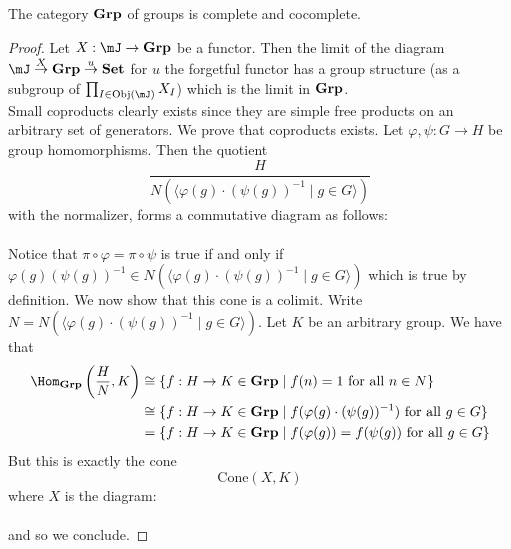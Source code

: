 \documentclass[a4paper]{article}
\begin{document}
\begin{crl}{}{} The category $\bold{Grp}$ of groups is complete and cocomplete. 
\begin{proof}
Let $X:\mJ\to\bold{Grp}$ be a functor. Then the limit of the diagram $\mJ\overset{X}{\to}\bold{Grp}\overset{u}{\to}\bold{Set}$ for $u$ the forgetful functor has a group structure (as a subgroup of $\prod_{I\in\text{Obj}(\mJ)}X_I$) which is the limit in $\bold{Grp}$. \\

Small coproducts clearly exists since they are simple free products on an arbitrary set of generators. We prove that coproducts exists. Let $\varphi,\psi:G\to H$ be group homomorphisms. Then the quotient $$\frac{H}{N(\langle\varphi(g)\cdot(\psi(g))^{-1}\;|\;g\in G\rangle)}$$ with the normalizer, forms a commutative diagram as follows: \\
 \\
Notice that $\pi\circ\varphi=\pi\circ\psi$ is true if and only if $\varphi(g)(\psi(g))^{-1}\in N(\langle\varphi(g)\cdot(\psi(g))^{-1}\;|\;g\in G\rangle)$ which is true by definition. We now show that this cone is a colimit. Write $N=N(\langle\varphi(g)\cdot(\psi(g))^{-1}\;|\;g\in G\rangle)$. Let $K$ be an arbitrary group. We have that 
\begin{align*}
\Hom_{\bold{Grp}}\left(\frac{H}{N},K\right)&\cong\{f:H\to K\in\bold{Grp}\;|\;f(n)=1\text{ for all }n\in N\}\\
&\cong\{f:H\to K\in\bold{Grp}\;|\;f(\varphi(g)\cdot(\psi(g))^{-1})\text{ for all }g\in G\}\\
&=\{f:H\to K\in\bold{Grp}\;|\;f(\varphi(g))=f(\psi(g))\text{ for all }g\in G\}
\end{align*}
But this is exactly the cone $$\text{Cone}\left(X,K\right)$$ where $X$ is the diagram: \\
 \\
and so we conclude. 
\end{proof}
\end{crl}
\end{document}
